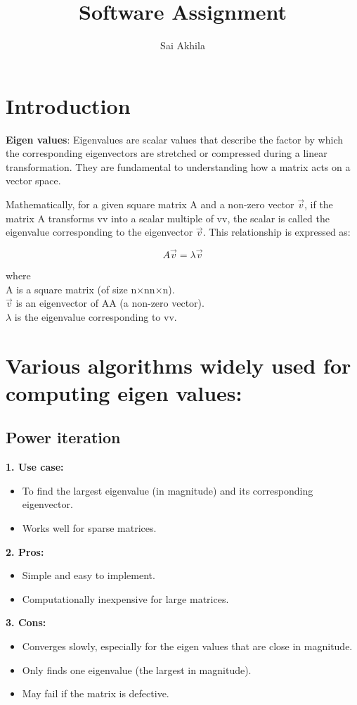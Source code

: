 \documentclass{article}
\title{Software Assignment}
\author{Sai Akhila }
\begin{document}
\maketitle

\section{Introduction}
\textbf{Eigen values}: Eigenvalues are scalar values that describe the factor by which the corresponding eigenvectors are stretched or compressed during a linear transformation. They are fundamental to understanding how a matrix acts on a vector space.

Mathematically, for a given square matrix A and a non-zero vector $\vec{v}$, if the matrix A transforms vv into a scalar multiple of vv, the scalar is called the eigenvalue corresponding to the eigenvector $\vec{v}$. This relationship is expressed as:
\begin{center}
\begin{equation}
    A\vec{v}=\lambda\vec{v}
\end{equation}
\end{center}
where \\
A is a square matrix (of size n×nn×n).\\
$\vec{v}$ is an eigenvector of AA (a non-zero vector).\\
$\lambda$ is the eigenvalue corresponding to vv.\\
\section{Various algorithms widely used for computing eigen values:}
\subsection{Power iteration}
\textbf{1. Use case:}
\begin{itemize}
    \item To find the largest eigenvalue (in magnitude) and its corresponding eigenvector.\\
    \item Works well for sparse matrices.
\end{itemize}
\textbf{2. Pros:}
\begin{itemize}
    \item Simple and easy to implement.
    \item Computationally inexpensive for large matrices.
\end{itemize}
\textbf{3. Cons:}
\begin{itemize}
    \item Converges slowly, especially for the eigen values that are close in magnitude.
    \item Only finds one eigenvalue (the largest in magnitude).
    \item May fail if the matrix is defective.
\end{itemize}
\end{document}
